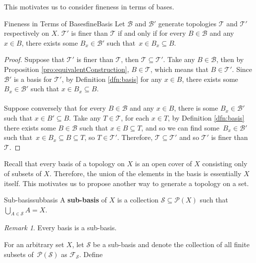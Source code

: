 \documentclass[math]{amznotes}
\theoremstyle{remark}
\newtheorem*{remark}{Remark}
\begin{document}
This motivates us to consider fineness in terms of bases.
\begin{probox}{Fineness in Terms of Bases}{fineBasis}
    Let $\mathcal{B}$ and $\mathcal{B}'$ generate topologies $\mathcal{T}$ and $\mathcal{T}'$ respectively on $X$. $\mathcal{T}'$ is finer than $\mathcal{T}$ if and only if for every $B \in \mathcal{B}$ and any $x \in B$, there exists some $B_x \in \mathcal{B}'$ such that~$x \in B_x \subseteq B$.
    \tcblower
    \begin{proof}
        Suppose that $\mathcal{T}'$ is finer than $\mathcal{T}$, then $\mathcal{T} \subseteq \mathcal{T}'$. Take any $B \in \mathcal{B}$, then by Proposition \ref{pro:equivalentConstruction}, $B \in \mathcal{T}$, which means that $B \in \mathcal{T}'$. Since $\mathcal{B}'$ is a basis for $\mathcal{T}'$, by Definition \ref{dfn:basis} for any $x \in B$, there exists some $B_x \in \mathcal{B}'$ such that $x \in B_x \subseteq B$.
        \\\\
        Suppose conversely that for every $B \in \mathcal{B}$ and any $x \in B$, there is some $B_x \in \mathcal{B}'$ such that $x \in B' \subseteq B$. Take any $T \in \mathcal{T}$, for each $x \in T$, by Definition \ref{dfn:basis} there exists some $B \in \mathcal{B}$ such that $x \in B \subseteq T$, and so we can find some~$B_x \in \mathcal{B}'$ such that~$x \in B_x \subseteq B \subseteq T$, so $T \in \mathcal{T}'$. Therefore, $\mathcal{T} \subseteq \mathcal{T}'$ and so $\mathcal{T}'$ is finer than~$\mathcal{T}$.
    \end{proof}
\end{probox}
Recall that every basis of a topology on $X$ is an open cover of $X$ consisting only of subsets of $X$. Therefore, the union of the elements in the basis is essentially $X$ itself. This motivates us to propose another way to generate a topology on a set.
\begin{dfnbox}{Sub-basis}{subbasis}
    A {\color{red} \textbf{sub-basis}} of $X$ is a collection $\mathcal{S} \subseteq \mathcal{P}\left(X\right)$ such that $\bigcup_{A \in \mathcal{S}}A = X$.
\end{dfnbox}
\begin{notebox}
    \begin{remark}
        Every basis is a sub-basis.
    \end{remark}
\end{notebox}
For an arbitrary set $X$, let $\mathcal{S}$ be a sub-basis and denote the collection of all finite subsets of~$\mathcal{P}\left(\mathcal{S}\right)$ as $\mathcal{F}_{\mathcal{S}}$. Define 
\end{document}
